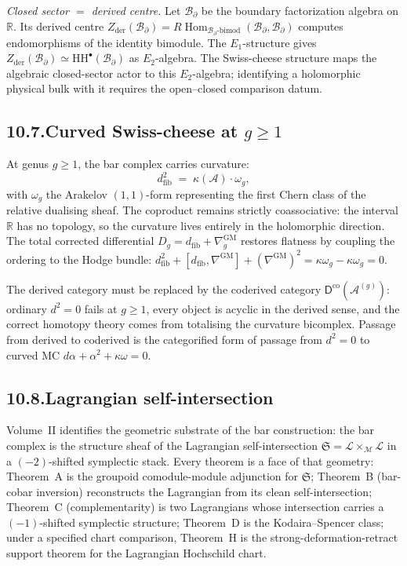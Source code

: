 \documentclass[11pt]{report}
\theoremstyle{definition}
\theoremstyle{remark}
\providecommand{\cA}{\mathcal{A}}
\providecommand{\cB}{\mathcal{B}}
\providecommand{\cL}{\mathcal{L}}
\providecommand{\cM}{\mathcal{M}}
\providecommand{\der}{\mathrm{der}}
\providecommand{\GM}{\mathrm{GM}}
\providecommand{\HH}{\mathrm{HH}}
\providecommand{\bR}{\mathbb{R}}
\providecommand{\co}{\mathrm{co}}
\DeclareMathOperator{\Hom}{Hom}
\numberwithin{equation}{section}
\begin{document}
\medskip\noindent\emph{Closed sector $=$ derived centre.} Let
$\cB_\partial$ be the boundary factorization algebra on $\bR$.
Its derived centre
$Z_{\der}(\cB_\partial) = R\Hom_{\cB_\partial\text{-bimod}}
(\cB_\partial, \cB_\partial)$
computes endomorphisms of the identity bimodule. The
$E_1$-structure gives
$Z_{\der}(\cB_\partial) \simeq \HH^\bullet(\cB_\partial)$ as
$E_2$-algebra. The Swiss-cheese structure maps the algebraic
closed-sector actor to this $E_2$-algebra; identifying a holomorphic
physical bulk with it requires the open--closed comparison datum.

\subsection*{10.7.\enspace Curved Swiss-cheese at $g \ge 1$}

At genus $g \ge 1$, the bar complex carries curvature:
\[
d_{\mathrm{fib}}^2 \;=\; \kappa(\cA)\cdot\omega_g,
\]
with $\omega_g$ the Arakelov $(1,1)$-form representing the first
Chern class of the relative dualising sheaf. The coproduct
remains strictly coassociative: the interval $\bR$ has no
topology, so the curvature lives entirely in the holomorphic
direction. The total corrected differential
$D_g = d_{\mathrm{fib}} + \nabla^{\GM}_g$ restores flatness by
coupling the ordering to the Hodge bundle:
$d_{\mathrm{fib}}^2 + [d_{\mathrm{fib}}, \nabla^{\GM}]
+ (\nabla^{\GM})^2 = \kappa\omega_g - \kappa\omega_g = 0$.

The derived category must be replaced by the coderived category
$\mathsf D^{\co}(\cA^{(g)})$: ordinary $d^2 = 0$ fails at $g \ge
1$, every object is acyclic in the derived sense, and the
correct homotopy theory comes from totalising the curvature
bicomplex. Passage from derived to coderived is the categorified
form of passage from $d^2 = 0$ to curved MC
$d\alpha + \alpha^2 + \kappa\omega = 0$.

\subsection*{10.8.\enspace Lagrangian self-intersection}

Volume~II identifies the geometric substrate of the bar
construction: the bar complex is the structure sheaf of the
Lagrangian self-intersection
$\mathfrak S = \cL \times_\cM \cL$ in a $(-2)$-shifted
symplectic stack. Every theorem is a face of that geometry:
Theorem~A is the groupoid comodule-module adjunction for
$\mathfrak S$; Theorem~B (bar-cobar inversion) reconstructs
the Lagrangian from its clean self-intersection; Theorem~C
(complementarity) is two Lagrangians whose intersection
carries a $(-1)$-shifted symplectic structure; Theorem~D is
the Kodaira--Spencer class; under a specified chart comparison,
Theorem~H is the strong-deformation-retract support theorem for the
Lagrangian Hochschild chart.
\end{document}
